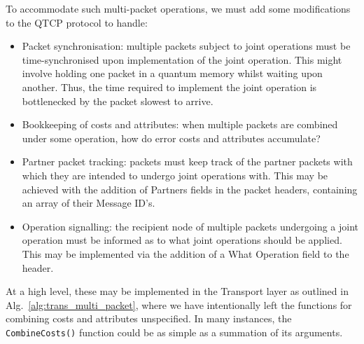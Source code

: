 \documentclass[aps, rmp, twocolumn, amsmath, amssymb, nofootinbib, superscriptaddress, longbibliography, floatfix, table-of-contents, eqsecnum]{revtex4-1}
\begin{document}
To accommodate such multi-packet operations, we must add some modifications to the QTCP protocol to handle:
\begin{itemize}
	\item Packet synchronisation: multiple packets subject to joint operations must be time-synchronised upon implementation of the joint operation. This might involve holding one packet in a quantum memory whilst waiting upon another. Thus, the time required to implement the joint operation is bottlenecked by the packet slowest to arrive.
	\item Bookkeeping of costs and attributes: when multiple packets are combined under some operation, how do error costs and attributes accumulate?
	\item Partner packet tracking: packets must keep track of the partner packets with which they are intended to undergo joint operations with. This may be achieved with the addition of {\sc Partners} fields in the packet headers, containing an array of their {\sc Message ID}'s.
	\item Operation signalling: the recipient node of multiple packets undergoing a joint operation must be informed as to what joint operations should be applied. This may be implemented via the addition of a {\sc What Operation} field to the header.
\end{itemize}

At a high level, these may be implemented in the {\sc Transport} layer as outlined in Alg.~\ref{alg:trans_multi_packet}, where we have intentionally left the functions for combining costs and attributes unspecified. In many instances, the \texttt{CombineCosts()} function could be as simple as a summation of its arguments.
\end{document}
